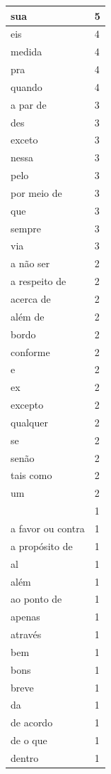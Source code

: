 \documentclass[output=paper,colorlinks,citecolor=brown]{langscibook}
\begin{document}
\begin{longtable}{ | p{3cm} | p{2cm} | }
		sua & 5\\\hline
		eis & 4\\\hline
		medida & 4\\\hline
		pra & 4\\\hline
		quando & 4\\\hline
		a par de & 3\\\hline
		des & 3\\\hline
		exceto & 3\\\hline
		nessa & 3\\\hline
		pelo & 3\\\hline
		por meio de & 3\\\hline
		que & 3\\\hline
		sempre & 3\\\hline
		via & 3\\\hline
		a não ser & 2\\\hline
		a respeito de & 2\\\hline
		acerca de & 2\\\hline
		além de & 2\\\hline
		bordo & 2\\\hline
		conforme & 2\\\hline
		e & 2\\\hline
		ex & 2\\\hline
		excepto & 2\\\hline
		qualquer & 2\\\hline
		se & 2\\\hline
		senão & 2\\\hline
		tais como & 2\\\hline
		um & 2\\\hline
		  & 1\\\hline
		a favor ou contra & 1\\\hline
		a propósito de & 1\\\hline
		al & 1\\\hline
		além & 1\\\hline
		ao ponto de & 1\\\hline
		apenas & 1\\\hline
		através & 1\\\hline
		bem & 1\\\hline
		bons & 1\\\hline
		breve & 1\\\hline
		da & 1\\\hline
		de acordo & 1\\\hline
		de o que & 1\\\hline
		dentro & 1\\\hline

\end{longtable}
\end{document}
